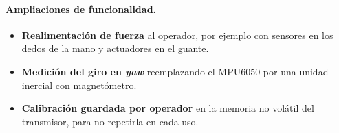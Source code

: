 \paragraph{Ampliaciones de funcionalidad.}
\begin{itemize}
    \item \textbf{Realimentación de fuerza} al operador, por ejemplo con sensores en los dedos de la mano y actuadores en el guante.
    \item \textbf{Medición del giro en \textit{yaw}} reemplazando el MPU6050 por una unidad inercial con magnetómetro.
    \item \textbf{Calibración guardada por operador} en la memoria no volátil del transmisor, para no repetirla en cada uso.
\end{itemize}
